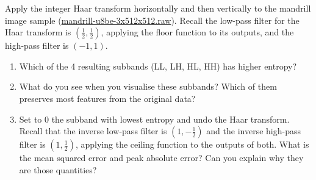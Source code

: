 \begin{exercise}
Apply the integer Haar transform horizontally and then vertically to the mandrill image sample (\url{mandrill-u8be-3x512x512.raw}). Recall the low-pass filter for the Haar transform is $\left( \frac{1}{2}, \frac{1}{2} \right)$, applying the floor function to its outputs, and the high-pass filter is $(-1, 1)$.
\begin{enumerate}
\item Which of the 4 resulting subbands (LL, LH, HL, HH) has higher entropy?
\item What do you see when you visualise these subbands? Which of them preserves most features from the original data?
\item Set to 0 the subband with lowest entropy and undo the Haar transform. Recall that the inverse low-pass filter is $\left( 1, -\frac{1}{2} \right)$ and the inverse high-pass filter is $\left( 1, \frac{1}{2}\right)$, applying the ceiling function to the outputs of both. What is the mean squared error and peak absolute error? Can you explain why they are those quantities?
\end{enumerate}
\end{exercise}

\vspace{0.25cm}

